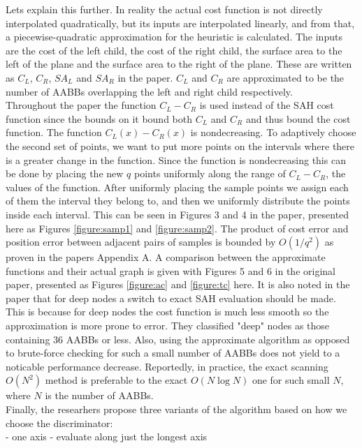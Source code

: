 \documentclass[12pt]{article}
\begin{document}
\indent Lets explain this further. In reality the actual cost function is not directly interpolated quadratically, but its inputs are interpolated linearly, and from that, a piecewise-quadratic approximation for the heuristic is calculated. The inputs are the cost of the left child, the cost of the right child, the surface area to the left of the plane and the surface area to the right of the plane. These are written as $C_L$, $C_R$, $SA_L$ and $SA_R$ in the paper. $C_L$ and $C_R$ are approximated to be the number of AABBs overlapping the left and right child respectively. \\
\indent Throughout the paper the function $C_L - C_R$ is used instead of the SAH cost function since the bounds on it bound both $C_L$ and $C_R$ and thus bound the cost function. The function $C_L(x) - C_R(x)$ is nondecreasing. To adaptively choose the second set of points, we want to put more points on the intervals where there is a greater change in the function. Since the function is nondecreasing this can be done by placing the new $q$ points uniformly along the range of $C_L - C_R$, the values of the function. After uniformly placing the sample points we assign each of them the interval they belong to, and then we uniformly distribute the points inside each interval. This can be seen in Figures 3 and 4 in the paper, presented here as Figures \ref{figure:samp1} and \ref{figure:samp2}. The product of cost error and position error between adjacent pairs of samples is bounded by $O(1/q^2)$ as proven in the papers Appendix A. A comparison between the approximate functions and their actual graph is given with Figures 5 and 6 in the original paper, presented as Figures \ref{figure:ac} and \ref{figure:tc} here. It is also noted in the paper that for deep nodes a switch to exact SAH evaluation should be made. This is because for deep nodes the cost function is much less smooth so the approximation is more prone to error. They classified "deep" nodes as those containing 36 AABBs or less. Also, using the approximate algorithm as opposed to brute-force checking for such a small number of AABBs does not yield to a noticable performance decrease. Reportedly, in practice, the exact scanning $O(N^2)$ method is preferable to the exact $O(N\log N)$ one for such small $N$, where $N$ is the number of AABBs. \\
\indent Finally, the researhers propose three variants of the algorithm based on how we choose the discriminator:\\
- one axis - evaluate along just the longest axis\\
\end{document}
